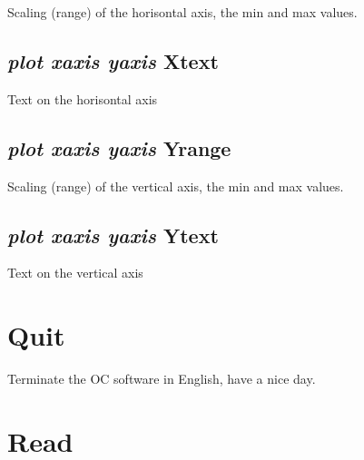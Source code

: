 \documentclass[12pt]{article}
\begin{document}
Scaling (range) of the horisontal axis, the min and max values.

\subsection{{\em plot xaxis yaxis} Xtext}

Text on the horisontal axis

\subsection{{\em plot xaxis yaxis} Yrange}

Scaling (range) of the vertical axis, the min and max values.

\subsection{{\em plot xaxis yaxis} Ytext}

Text on the vertical axis

\section{Quit }

Terminate the OC software in English, have a nice day.

\section{Read }
\end{document}
